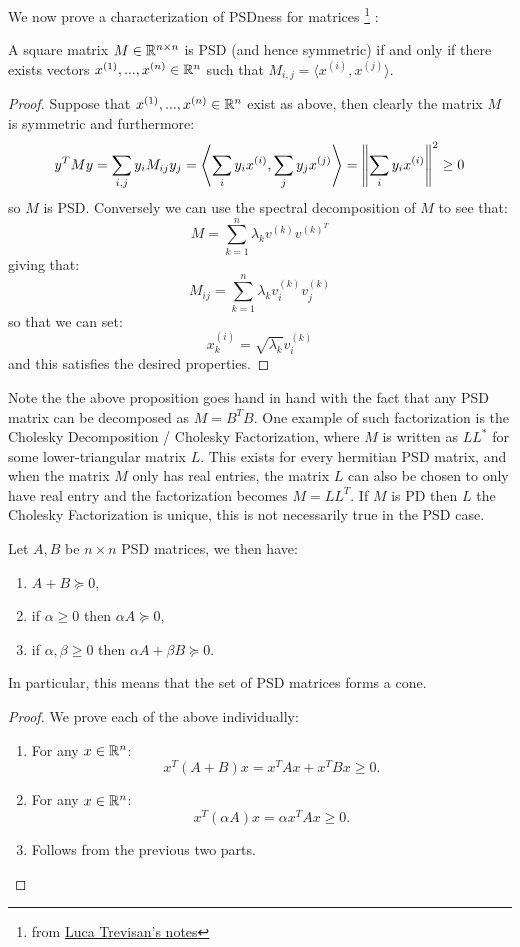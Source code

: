 We now prove a characterization of PSDness for matrices \footnote{from \href{https://people.eecs.berkeley.edu/~luca/bwca17/lectures/lecture04s.pdf}{Luca Trevisan's notes}} :
\begin{proposition}
A square matrix $M \in \mathbb{R}^{n\times n}$ is PSD (and hence symmetric) if and only if there exists vectors $x^{(1)}, ... , x^{(n)} \in \mathbb{R}^n$ such that $M_{i,j} = \langle x^{(i)}, x^{(j)} \rangle$.
\end{proposition}
\begin{proof}
Suppose that $x^{(1)}, ... , x^{(n)} \in \mathbb{R}^n$ exist as above, then clearly the matrix $M$ is symmetric and furthermore:
\[
    y^TMy = \sum_{i,j} y_i M_{ij}y_j = \left\langle \sum_i y_i x^{(i)}, \sum_j y_j x^{(j)}\right\rangle = \left\lVert\sum_iy_i x^{(i)}\right\rVert^2 \geq 0
\]
so $M$ is PSD. Conversely we can use the spectral decomposition of $M$ to see that:
\[
    M = \sum_{k=1}^n\lambda_k v^{(k)}v^{{(k)}^T}
\]
giving that:
\[
    M_{ij} = \sum_{k=1}^n \lambda_k v_i^{(k)}v_j^{(k)}
\]
so that we can set:
\[
    x_k^{(i)} = \sqrt{\lambda_k}v^{(k)}_i
\]
and this satisfies the desired properties.
\end{proof}
Note the the above proposition goes hand in hand with the fact that any PSD matrix can be decomposed as $M = B^TB$. One example of such factorization is the Cholesky Decomposition / Cholesky Factorization, where $M$ is written as $LL^*$ for some lower-triangular matrix $L$. This exists for every hermitian PSD matrix, and when the matrix $M$ only has real entries, the matrix $L$ can also be chosen to only have real entry and the factorization becomes $M= LL^T$. If $M$ is PD then $L$ the Cholesky Factorization is unique, this is not necessarily true in the PSD case.\\

\begin{proposition}
Let $A,B$ be $n\times n$ PSD matrices, we then have:
\begin{enumerate}
    \item $A+B \succeq 0$,
    \item if $\alpha \geq 0$ then $\alpha A \succeq 0$,
    \item if $\alpha,\beta \geq 0$  then $\alpha A + \beta B \succeq 0$.
\end{enumerate}
In particular, this means that the set of PSD matrices forms a cone.
\end{proposition}
\begin{proof}
We prove each of the above individually:
\begin{enumerate}
    \item For any $x \in \mathbb{R}^n$:
    \[
        x^T(A+B)x = x^TAx + x^TBx \geq 0.
    \]
    \item For any $x \in \mathbb{R}^n$:
    \[
        x^T(\alpha A) x = \alpha x^T A x \geq 0.
    \]
    \item Follows from the previous two parts.
\end{enumerate}
\end{proof}

